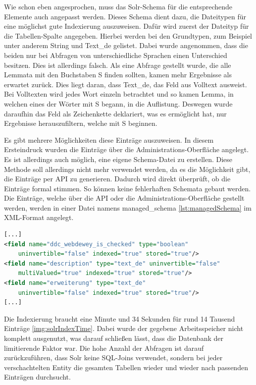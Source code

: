 Wie schon eben angesprochen, muss das Solr-Schema für die entsprechende Elemente auch angepasst werden. Dieses Schema dient dazu, die Dateitypen für eine möglichst gute Indexierung auszuweisen. Dafür wird zuerst der Dateityp für die Tabellen-Spalte angegeben. Hierbei werden bei den Grundtypen, zum Beispiel unter anderem String und Text\_de gelistet. Dabei wurde angenommen, dass die beiden nur bei Abfragen von unterschiedliche Sprachen einen Unterschied besitzen. Dies ist allerdings falsch. Als eine Abfrage gestellt wurde, die alle Lemmata mit den Buchstaben S finden sollten, kamen mehr Ergebnisse als erwartet zurück. Dies liegt daran, dass Text\_de, das Feld aus Volltext ausweist. 
Bei Volltexten wird jedes Wort einzeln betrachtet und so kamen Lemma, in welchen eines der Wörter mit S begann, in die Auflistung. Deswegen wurde daraufhin das Feld als Zeichenkette deklariert, was es ermöglicht hat, nur Ergebnisse herauszufiltern, welche mit S beginnen.

Es gibt mehrere Möglichkeiten diese Einträge auszuweisen. In diesem Ersteindruck wurden die Einträge über die Administrations-Oberfläche angelegt. Es ist allerdings auch möglich, eine eigene Schema-Datei zu erstellen. Diese Methode soll allerdings nicht mehr verwendet werden, da es die Möglichkeit gibt, die Einträge per API zu generieren. Dadurch wird direkt überprüft, ob die Einträge formal stimmen. So können keine fehlerhaften Schemata gebaut werden. Die Einträge, welche über die API oder die Administrations-Oberfläche gestellt werden, werden in einer Datei namens managed\_schema \ref{lst:managedSchema} im XML-Format angelegt.


\begin{lstlisting}[language=xml, frame=single, label={lst:managedSchema}, 
    morekeywords={type,uninvertible,indexed,stored,field,multiValued, name},  caption=Auschnitt auf dem managed\_schema,captionpos=b] 
[...]
<field name="ddc_webdewey_is_checked" type="boolean" 
    uninvertible="false" indexed="true" stored="true"/>
<field name="description" type="text_de" uninvertible="false" 
    multiValued="true" indexed="true" stored="true"/>
<field name="erweiterung" type="text_de" 
    uninvertible="false" indexed="true" stored="true"/>
[...]
\end{lstlisting}

Die Indexierung braucht eine Minute und 34 Sekunden für rund 14 Tausend Einträge \ref{img:solrIndexTime}. Dabei wurde der gegebene Arbeitsspeicher nicht komplett ausgenutzt, was darauf schließen lässt, dass die Datenbank der limitierende Faktor war. Die hohe Anzahl der Abfragen ist darauf zurückzuführen, dass Solr keine SQL-Joins verwendet, sondern bei jeder verschachtelten Entity die gesamten Tabellen wieder und wieder nach passenden Einträgen durchsucht.

